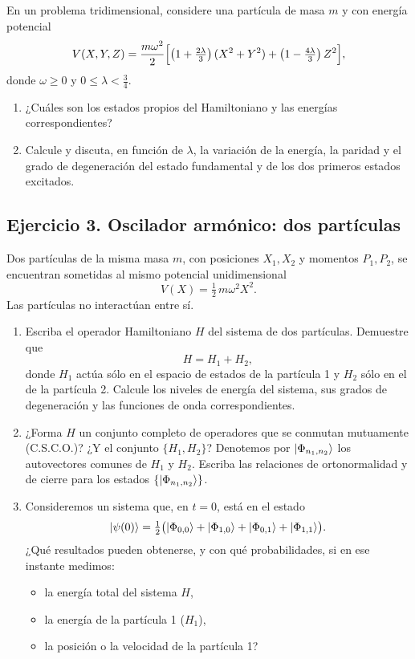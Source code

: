 \documentclass[a4paper,11pt]{article}
\begin{document}
En un problema tridimensional, considere una partícula de masa \(m\) y con energía potencial
\[
V(X,Y,Z)
= \frac{m\omega^2}{2}\Bigl[\bigl(1+\tfrac{2\lambda}{3}\bigr)\,(X^2+Y^2)
                      +\bigl(1-\tfrac{4\lambda}{3}\bigr)\,Z^2\Bigr],
\]
donde \(\omega\ge0\) y \(0\le\lambda<\tfrac34\).

\begin{enumerate}
  \item ¿Cuáles son los estados propios del Hamiltoniano y las energías correspondientes?
  \item Calcule y discuta, en función de \(\lambda\), la variación de la energía, la paridad y el grado de degeneración del estado fundamental y de los dos primeros estados excitados.
\end{enumerate}

\subsection*{Ejercicio 3. Oscilador armónico: dos partículas}

Dos partículas de la misma masa \(m\), con posiciones \(X_1,X_2\) y momentos \(P_1,P_2\), se encuentran sometidas al mismo potencial unidimensional
\[
V(X)=\tfrac12\,m\omega^2X^2.
\]
Las partículas no interactúan entre sí.

\begin{enumerate}
  \item Escriba el operador Hamiltoniano \(H\) del sistema de dos partículas. Demuestre que
  \[
    H = H_1 + H_2,
  \]
  donde \(H_1\) actúa sólo en el espacio de estados de la partícula 1 y \(H_2\) sólo en el de la partícula 2. Calcule los niveles de energía del sistema, sus grados de degeneración y las funciones de onda correspondientes.
  
  \item ¿Forma \(H\) un conjunto completo de operadores que se conmutan mutuamente (C.S.C.O.)? ¿Y el conjunto \(\{H_1,H_2\}\)? Denotemos por \(\ket{\Phi_{n_1,n_2}}\) los autovectores comunes de \(H_1\) y \(H_2\). Escriba las relaciones de ortonormalidad y de cierre para los estados \(\{\ket{\Phi_{n_1,n_2}}\}\).
  
  \item Consideremos un sistema que, en \(t=0\), está en el estado
  \[
    \ket{\psi(0)}
    = \tfrac12\bigl(\ket{\Phi_{0,0}} + \ket{\Phi_{1,0}} + \ket{\Phi_{0,1}} + \ket{\Phi_{1,1}}\bigr).
  \]
  ¿Qué resultados pueden obtenerse, y con qué probabilidades, si en ese instante medimos:
  \begin{itemize}
    \item la energía total del sistema \(H\),
    \item la energía de la partícula 1 (\(H_1\)),
    \item la posición o la velocidad de la partícula 1?
  \end{itemize}
\end{enumerate}
\end{document}
